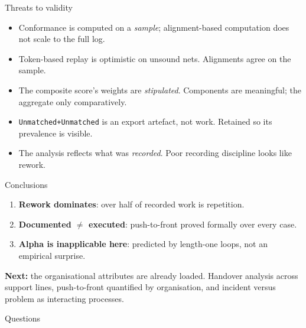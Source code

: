 \documentclass[aspectratio=169]{beamer}
\newcommand{\act}[1]{\texttt{\small #1}}
\begin{document}
\begin{frame}{Threats to validity}
\begin{itemize}
  \item Conformance is computed on a \emph{sample}; alignment-based computation
        does not scale to the full log.
  \item Token-based replay is optimistic on unsound nets. Alignments agree on
        the sample.
  \item The composite score's weights are \emph{stipulated}. Components are
        meaningful; the aggregate only comparatively.
  \item \act{Unmatched+Unmatched} is an export artefact, not work. Retained so
        its prevalence is visible.
  \item The analysis reflects what was \emph{recorded}. Poor recording discipline looks
        like rework.
\end{itemize}
\end{frame}

\begin{frame}{Conclusions}
\begin{enumerate}
  \item \textbf{Rework dominates}: over half of recorded work is repetition.
  \item \textbf{Documented $\neq$ executed}: push-to-front proved formally
        over every case.
  \item \textbf{Alpha is inapplicable here}: predicted by length-one loops,
        not an empirical surprise.
\end{enumerate}
\bigskip
\textbf{Next:} the organisational attributes are already loaded. Handover
analysis across support lines, push-to-front quantified by organisation, and
incident versus problem as interacting processes.
\end{frame}

\begin{frame}[plain]
\begin{center}
\Huge Questions
\end{center}
\end{frame}
\end{document}
